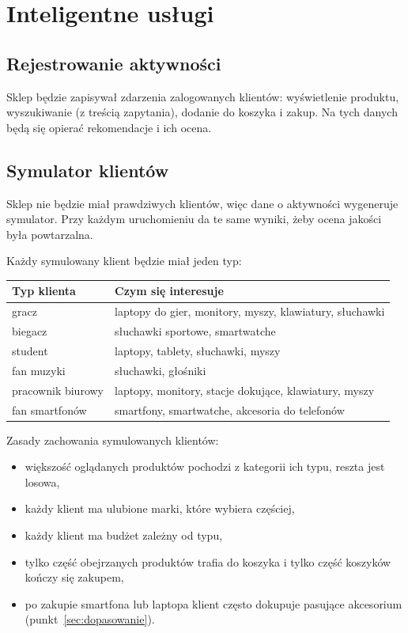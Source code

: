 \documentclass[11pt,a4paper]{article}
\begin{document}
\section{Inteligentne usługi}

\subsection{Rejestrowanie aktywności}\label{sec:aktywnosc}

Sklep będzie zapisywał zdarzenia zalogowanych klientów: wyświetlenie produktu, wyszukiwanie (z treścią
zapytania), dodanie do koszyka i zakup. Na tych danych będą się opierać rekomendacje i ich ocena.

\subsection{Symulator klientów}\label{sec:symulator}

Sklep nie będzie miał prawdziwych klientów, więc dane o aktywności wygeneruje symulator. Przy każdym
uruchomieniu da te same wyniki, żeby ocena jakości była powtarzalna.

Każdy symulowany klient będzie miał jeden typ:

{\small
\begin{tabularx}{\textwidth}{P{3.6cm}L}
\toprule
\textbf{Typ klienta} & \textbf{Czym się interesuje} \\
\midrule
gracz & laptopy do gier, monitory, myszy, klawiatury, słuchawki \\
biegacz & słuchawki sportowe, smartwatche \\
student & laptopy, tablety, słuchawki, myszy \\
fan muzyki & słuchawki, głośniki \\
pracownik biurowy & laptopy, monitory, stacje dokujące, klawiatury, myszy \\
fan smartfonów & smartfony, smartwatche, akcesoria do telefonów \\
\bottomrule
\end{tabularx}\par\medskip
}

Zasady zachowania symulowanych klientów:
\begin{itemize}
  \item większość oglądanych produktów pochodzi z kategorii ich typu, reszta jest losowa,
  \item każdy klient ma ulubione marki, które wybiera częściej,
  \item każdy klient ma budżet zależny od typu,
  \item tylko część obejrzanych produktów trafia do koszyka i tylko część koszyków kończy się zakupem,
  \item po zakupie smartfona lub laptopa klient często dokupuje pasujące akcesorium
        (punkt~\ref{sec:dopasowanie}).
\end{itemize}
\end{document}
